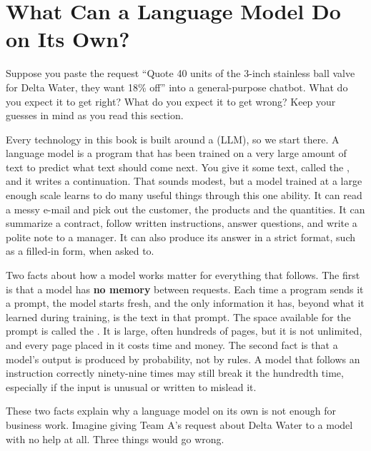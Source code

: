 \section{What Can a Language Model Do on Its Own?}
\label{sec:llm}

\begin{thinkabout}
Suppose you paste the request ``Quote 40 units of the 3-inch stainless ball valve for Delta Water, they want 18\% off'' into a general-purpose chatbot. What do you expect it to get right? What do you expect it to get wrong? Keep your guesses in mind as you read this section.
\end{thinkabout}

Every technology in this book is built around a  (LLM), so we start there. A language model is a program that has been trained on a very large amount of text to predict what text should come next. You give it some text, called the , and it writes a continuation. That sounds modest, but a model trained at a large enough scale learns to do many useful things through this one ability. It can read a messy e-mail and pick out the customer, the products and the quantities. It can summarize a contract, follow written instructions, answer questions, and write a polite note to a manager. It can also produce its answer in a strict format, such as a filled-in form, when asked to.

Two facts about how a model works matter for everything that follows. The first is that a model has \textbf{no memory} between requests. Each time a program sends it a prompt, the model starts fresh, and the only information it has, beyond what it learned during training, is the text in that prompt. The space available for the prompt is called the . It is large, often hundreds of pages, but it is not unlimited, and every page placed in it costs time and money. The second fact is that a model's output is produced by probability, not by rules. A model that follows an instruction correctly ninety-nine times may still break it the hundredth time, especially if the input is unusual or written to mislead it.

These two facts explain why a language model on its own is not enough for business work. Imagine giving Team A's request about Delta Water to a model with no help at all. Three things would go wrong.

